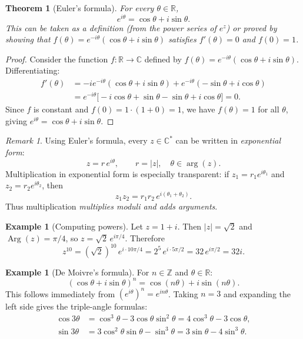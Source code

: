\documentclass[12pt,a4paper,openany]{book}
\theoremstyle{definition}
\newtheorem{example}[definition]{Example}
\theoremstyle{plain}
\newtheorem{theorem}[definition]{Theorem}
\theoremstyle{remark}
\newtheorem{remark}[definition]{Remark}
\newcommand{\C}{\mathbb{C}}
\newcommand{\R}{\mathbb{R}}
\newcommand{\Z}{\mathbb{Z}}
\DeclareMathOperator{\Arg}{Arg}
\newcommand{\abs}[1]{\left|#1\right|}
\begin{document}
\begin{theorem}[Euler's formula]
\label{thm:euler}
For every $\theta\in\R$,
\[
  e^{i\theta} = \cos\theta + i\sin\theta.
\]
This can be taken as a definition (from the power series of $e^z$) or proved by showing that $f(\theta) = e^{-i\theta}(\cos\theta+i\sin\theta)$ satisfies $f'(\theta)=0$ and $f(0)=1$.
\end{theorem}

\begin{proof}
Consider the function $f:\R\to\C$ defined by $f(\theta) = e^{-i\theta}(\cos\theta+i\sin\theta)$. Differentiating:
\begin{align*}
f'(\theta) &= -ie^{-i\theta}(\cos\theta+i\sin\theta) + e^{-i\theta}(-\sin\theta+i\cos\theta) \\
            &= e^{-i\theta}\bigl[-i\cos\theta+\sin\theta-\sin\theta+i\cos\theta\bigr] = 0.
\end{align*}
Since $f$ is constant and $f(0) = 1\cdot(1+0) = 1$, we have $f(\theta)=1$ for all $\theta$, giving $e^{i\theta} = \cos\theta+i\sin\theta$.
\end{proof}

\begin{remark}
Using Euler's formula, every $z\in\C^*$ can be written in \emph{exponential form}:
\[
  z = r\,e^{i\theta}, \qquad r = \abs{z},\quad \theta\in\arg(z).
\]
Multiplication in exponential form is especially transparent: if $z_1 = r_1 e^{i\theta_1}$ and $z_2 = r_2 e^{i\theta_2}$, then
\[
  z_1 z_2 = r_1 r_2\, e^{i(\theta_1+\theta_2)}.
\]
Thus multiplication \emph{multiplies moduli and adds arguments}.
\end{remark}

\begin{example}[Computing powers]
\label{ex:powers}
Let $z = 1+i$. Then $\abs{z} = \sqrt{2}$ and $\Arg(z) = \pi/4$, so $z = \sqrt{2}\,e^{i\pi/4}$. Therefore
\[
  z^{10} = (\sqrt{2})^{10}\, e^{i\cdot 10\pi/4} = 2^5\, e^{i\cdot 5\pi/2} = 32\, e^{i\pi/2} = 32i.
\]
\end{example}

\begin{example}[De Moivre's formula]
For $n\in\Z$ and $\theta\in\R$:
\[
  (\cos\theta+i\sin\theta)^n = \cos(n\theta)+i\sin(n\theta).
\]
This follows immediately from $(e^{i\theta})^n = e^{in\theta}$. Taking $n=3$ and expanding the left side gives the triple-angle formulas:
\begin{align*}
  \cos 3\theta &= \cos^3\theta - 3\cos\theta\sin^2\theta = 4\cos^3\theta - 3\cos\theta,\\
  \sin 3\theta &= 3\cos^2\theta\sin\theta - \sin^3\theta = 3\sin\theta - 4\sin^3\theta.
\end{align*}
\end{example}
\end{document}
